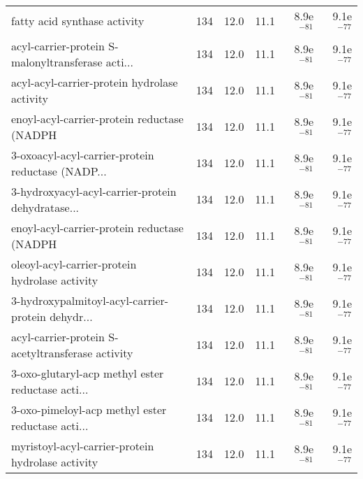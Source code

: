 \begin{longtable}{lrrrrr}
                      fatty acid synthase activity &                     134 &                    12.0 &       11.1 &         8.9e$^{-81}$ &         9.1e$^{-77}$ \\
 acyl-carrier-protein S-malonyltransferase acti... &                     134 &                    12.0 &       11.1 &         8.9e$^{-81}$ &         9.1e$^{-77}$ \\
      acyl-acyl-carrier-protein hydrolase activity &                     134 &                    12.0 &       11.1 &         8.9e$^{-81}$ &         9.1e$^{-77}$ \\
       enoyl-acyl-carrier-protein reductase (NADPH &                     134 &                    12.0 &       11.1 &         8.9e$^{-81}$ &         9.1e$^{-77}$ \\
 3-oxoacyl-acyl-carrier-protein reductase (NADP... &                     134 &                    12.0 &       11.1 &         8.9e$^{-81}$ &         9.1e$^{-77}$ \\
 3-hydroxyacyl-acyl-carrier-protein dehydratase... &                     134 &                    12.0 &       11.1 &         8.9e$^{-81}$ &         9.1e$^{-77}$ \\
       enoyl-acyl-carrier-protein reductase (NADPH &                     134 &                    12.0 &       11.1 &         8.9e$^{-81}$ &         9.1e$^{-77}$ \\
    oleoyl-acyl-carrier-protein hydrolase activity &                     134 &                    12.0 &       11.1 &         8.9e$^{-81}$ &         9.1e$^{-77}$ \\
 3-hydroxypalmitoyl-acyl-carrier-protein dehydr... &                     134 &                    12.0 &       11.1 &         8.9e$^{-81}$ &         9.1e$^{-77}$ \\
 acyl-carrier-protein S-acetyltransferase activity &                     134 &                    12.0 &       11.1 &         8.9e$^{-81}$ &         9.1e$^{-77}$ \\
 3-oxo-glutaryl-acp methyl ester reductase acti... &                     134 &                    12.0 &       11.1 &         8.9e$^{-81}$ &         9.1e$^{-77}$ \\
 3-oxo-pimeloyl-acp methyl ester reductase acti... &                     134 &                    12.0 &       11.1 &         8.9e$^{-81}$ &         9.1e$^{-77}$ \\
 myristoyl-acyl-carrier-protein hydrolase activity &                     134 &                    12.0 &       11.1 &         8.9e$^{-81}$ &         9.1e$^{-77}$ \\

\end{longtable}
